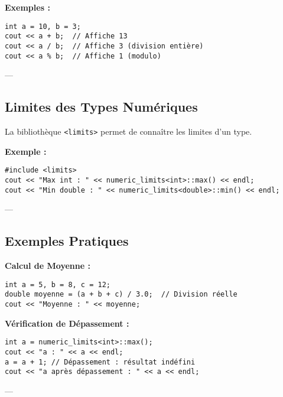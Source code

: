 \textbf{Exemples :}
\begin{tcolorbox}[colframe=blue!50!black, colback=blue!5!white, title=Exemples d'Opérations sur les Types Numériques]
\begin{verbatim}
int a = 10, b = 3;
cout << a + b;  // Affiche 13
cout << a / b;  // Affiche 3 (division entière)
cout << a % b;  // Affiche 1 (modulo)
\end{verbatim}
\end{tcolorbox}

---

\subsection{ Limites des Types Numériques}
La bibliothèque \texttt{<limits>} permet de connaître les limites d'un type.

\textbf{Exemple :}
\begin{tcolorbox}[colframe=blue!50!black, colback=blue!5!white, title=Exemple de Limites des Types Numériques]
\begin{verbatim}
#include <limits>
cout << "Max int : " << numeric_limits<int>::max() << endl;
cout << "Min double : " << numeric_limits<double>::min() << endl;
\end{verbatim}
\end{tcolorbox}

---

\subsection{ Exemples Pratiques}
\textbf{Calcul de Moyenne :}
\begin{tcolorbox}[colframe=blue!50!black, colback=blue!5!white, title=Exemple de Calcul de Moyenne]
\begin{verbatim}
int a = 5, b = 8, c = 12;
double moyenne = (a + b + c) / 3.0;  // Division réelle
cout << "Moyenne : " << moyenne;
\end{verbatim}
\end{tcolorbox}

\textbf{Vérification de Dépassement :}
\begin{tcolorbox}[colframe=blue!50!black, colback=blue!5!white, title=Exemple de Vérification de Dépassement]
\begin{verbatim}
int a = numeric_limits<int>::max();
cout << "a : " << a << endl;
a = a + 1; // Dépassement : résultat indéfini
cout << "a après dépassement : " << a << endl;
\end{verbatim}
\end{tcolorbox}

---

